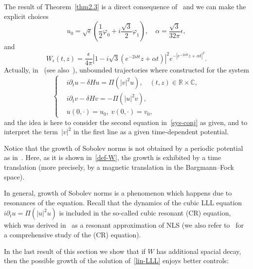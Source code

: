 \documentclass[10pt]{amsart}
\theoremstyle{definition}\newtheorem{defi}[theo]{Definition}\newtheorem{rema}[theo]{Remark}\newtheorem{exam}[theo]{Example}\newtheorem{exem}[theo]{Example}\newtheorem{nota}[theo]{Notation}
\newcommand{\C}{\mathbb{C}}
\newcommand{\R}{\mathbb{R}}
\newcommand*\eps{\epsilon}
\newcommand*\dis{\displaystyle}
\newcommand{\<}{\langle}
\renewcommand{\>}{\rangle}
\renewcommand{\phi}{\varphi}
\begin{document}
The result of Theorem~\ref{thm2.3} is a direct consequence of~\cite[Theorem~1.5 and Corollary~1.6]{Schw-Tho} and we can make the explicit choices
\[
\dis u_0=\sqrt{\eps} \left(\frac12\phi_0+i\frac{\sqrt{3}}2\phi_1\right), \quad \alpha=\frac{\sqrt{3}}{32 \pi}\eps,
\]
and
\begin{equation}\label{def-W}
W_\eps(t,z)=\frac{\eps}{4\pi}\left| 1-i\sqrt{3}\left(e^{-2i \delta t}z+\alpha t\right) \right|^2e^{-\left|e^{-2i \delta t}z+\alpha t\right|^2}.
\end{equation}
Actually, in~\cite[Theorem~1.5 and Corollary~1.6]{Schw-Tho} (see also~\cite[equation~(2.4)]{Schw-Tho}), unbounded trajectories where constructed for the system
\begin{equation}\label{sys-conj}
\left\{
\begin{aligned}
&i\partial_{t}{u}-\delta H{u} = \Pi \left(|{v}|^2 {u}\right), \quad (t,z)\in \R\times \C,\\
&i\partial_{t}{v}-\delta H{v}= - \Pi \left(|{u}|^2 {v}\right),\\
&{u}(0,\cdot)= u_0,\; {v}(0,\cdot)= v_0,
\end{aligned}
\right.
\end{equation}
and the idea is here to consider the second equation in~\eqref{sys-conj} as given, and to interpret the term~$|v|^2$ in the first line as a given time-dependent potential.

Notice that the growth of Sobolev norms is not obtained by a periodic potential as in~\cite{BGMR2,Delort}. Here, as it is shown in~\eqref{def-W}, the growth is exhibited by a time translation (more precisely, by a magnetic translation in the Bargmann--Fock space).

In general, growth of Sobolev norms is a phenomenon which happens due to resonances of the equation. Recall that the dynamics of the cubic LLL equation $i \partial_t u = \Pi(|u|^2u)$ is included in the so-called cubic resonant (CR) equation, which was derived in~\cite{FGH} as a resonant approximation of NLS (we also refer to~\cite{GHT1} for a comprehensive study of the (CR) equation).


In the last result of this section we show that if $W$ has additional spacial decay, then the possible growth of the solution of~\eqref{lin-LLL} enjoys better controls:
\end{document}
